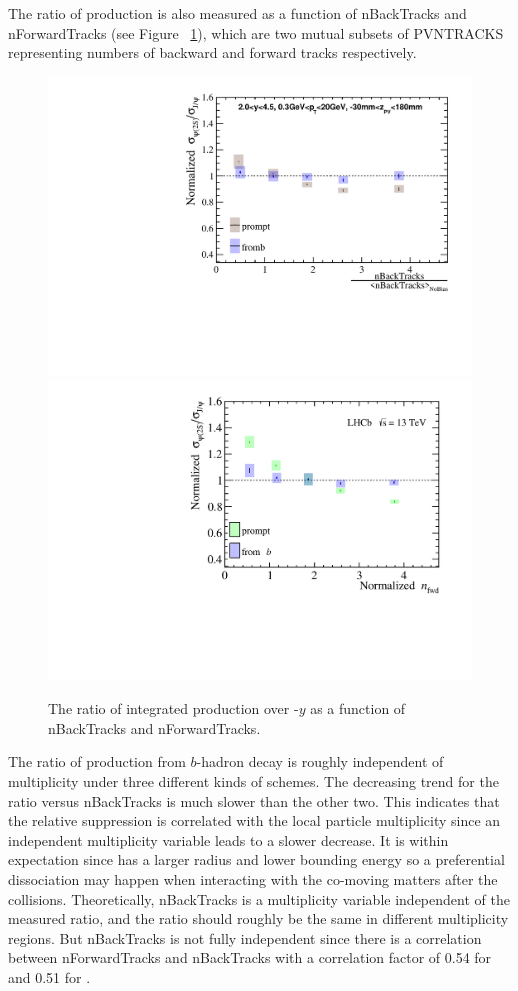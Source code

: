 The ratio of production is also measured as a function of nBackTracks and nForwardTracks (see Figure ~\ref{RatioFB}), which are two mutual subsets of PVNTRACKS representing numbers of backward and forward tracks respectively. 
\begin{figure}[!tbp]
  \begin{center}
    \includegraphics[width=0.49\linewidth]{pdf/Result/AllB.pdf}
    \includegraphics[width=0.49\linewidth]{pdf/Result/AllF.pdf}
    \vspace*{-0.5cm}
  \end{center}
  \caption{The ratio of integrated production over \pt-$y$ as a function of nBackTracks and nForwardTracks.
    }
  \label{RatioFB}
\end{figure}
The ratio of production from $b$-hadron decay is roughly independent of multiplicity under three different kinds of schemes. The decreasing trend for the ratio versus nBackTracks is much slower than the other two. 
This indicates that the relative suppression is correlated with the local particle multiplicity since an independent multiplicity variable leads to a slower decrease. It is within expectation since \psitwos has a larger radius and 
lower bounding energy so a preferential dissociation may happen when interacting with the co-moving matters after the collisions. Theoretically, nBackTracks is a multiplicity variable independent of the measured ratio, and the ratio should roughly be the same in different multiplicity regions. But nBackTracks is not fully independent since there is a correlation between nForwardTracks and nBackTracks with a correlation factor of 0.54 for \jpsi and 0.51 for \psitwos.
